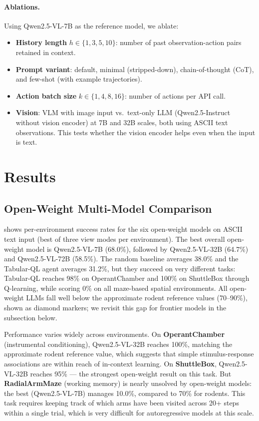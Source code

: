 \documentclass[letterpaper]{article}
\begin{document}
\paragraph{Ablations.}
Using Qwen2.5-VL-7B as the reference model, we ablate:
\begin{itemize}
    \item \textbf{History length} $h \in \{1, 3, 5, 10\}$: number of past observation-action pairs retained in context.
    \item \textbf{Prompt variant}: default, minimal (stripped-down), chain-of-thought (CoT), and few-shot (with example trajectories).
    \item \textbf{Action batch size} $k \in \{1, 4, 8, 16\}$: number of actions per API call.
    \item \textbf{Vision}: VLM with image input vs.\ text-only LLM (Qwen2.5-Instruct without vision encoder) at 7B and 32B scales, both using ASCII text observations. This tests whether the vision encoder helps even when the input is text.
\end{itemize}


\section{Results}

\subsection{Open-Weight Multi-Model Comparison}

 shows per-environment success rates for the six open-weight models on ASCII text input (best of three view modes per environment).
The best overall open-weight model is Qwen2.5-VL-7B (68.0\%), followed by Qwen2.5-VL-32B (64.7\%) and Qwen2.5-VL-72B (58.5\%).
The random baseline averages 38.0\% and the Tabular-QL agent averages 31.2\%, but they succeed on very different tasks: Tabular-QL reaches 98\% on OperantChamber and 100\% on ShuttleBox through Q-learning, while scoring 0\% on all maze-based spatial environments.
All open-weight LLMs fall well below the approximate rodent reference values (70--90\%), shown as diamond markers; we revisit this gap for frontier models in the  subsection below.

Performance varies widely across environments.
On \textbf{OperantChamber} (instrumental conditioning), Qwen2.5-VL-32B reaches 100\%, matching the approximate rodent reference value, which suggests that simple stimulus-response associations are within reach of in-context learning.
On \textbf{ShuttleBox}, Qwen2.5-VL-32B reaches 95\% --- the strongest open-weight result on this task.
But \textbf{RadialArmMaze} (working memory) is nearly unsolved by open-weight models: the best (Qwen2.5-VL-7B) manages 10.0\%, compared to 70\% for rodents.
This task requires keeping track of which arms have been visited across 20+ steps within a single trial, which is very difficult for autoregressive models at this scale.
\end{document}
